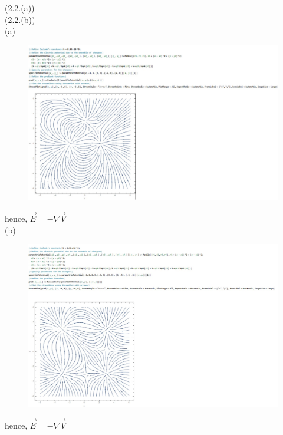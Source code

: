 \documentclass[journal,12pt,onecolumn]{IEEEtran}
\theoremstyle{remark}
\begin{document}
    
(2.2.(a))\\
(2.2.(b))\\
(a)\begin{figure}[H]
    \centering
     \includegraphics[scale=0.5]{figs/e.3.jpeg}
    \caption{}    
    \label{fig:ishitha.em.fig1}
   \end{figure} 
 hence, $\overrightarrow{E}=-\nabla\overrightarrow{V}  $\\
\newpage 
 (b)\begin{figure}[H]
    \centering
     \includegraphics[scale=0.5]{figs/e.2.jpeg}
    \caption{}    
    \label{fig:ishitha.em.fig1}
   \end{figure} 
 hence, $\overrightarrow{E}=-\nabla\overrightarrow{V}  $\\
\end{document}
